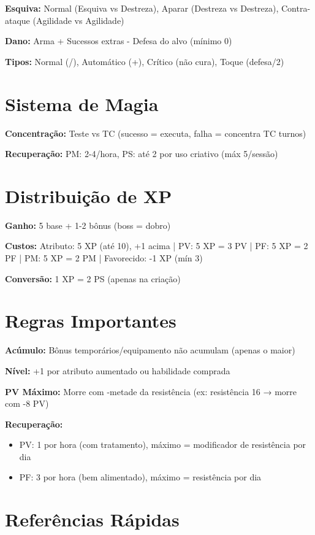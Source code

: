 \textbf{Esquiva:} Normal (Esquiva vs Destreza), Aparar (Destreza vs Destreza), Contra-ataque (Agilidade vs Agilidade)

\textbf{Dano:} Arma + Sucessos extras - Defesa do alvo (mínimo 0)

\textbf{Tipos:} Normal (/), Automático (+), Crítico (não cura), Toque (defesa/2)

\section{Sistema de Magia}

\textbf{Concentração:} Teste vs TC (sucesso = executa, falha = concentra TC turnos)


\textbf{Recuperação:} PM: 2-4/hora, PS: até 2 por uso criativo (máx 5/sessão)

\section{Distribuição de XP}

\textbf{Ganho:} 5 base + 1-2 bônus (boss = dobro)

\textbf{Custos:} Atributo: 5 XP (até 10), +1 acima | PV: 5 XP = 3 PV | PF: 5 XP = 2 PF | PM: 5 XP = 2 PM | Favorecido: -1 XP (mín 3)

\textbf{Conversão:} 1 XP = 2 PS (apenas na criação)

\section{Regras Importantes}

\textbf{Acúmulo:} Bônus temporários/equipamento não acumulam (apenas o maior)

\textbf{Nível:} +1 por atributo aumentado ou habilidade comprada

\textbf{PV Máximo:} Morre com -metade da resistência (ex: resistência 16 → morre com -8 PV)

\textbf{Recuperação:}
\begin{itemize}
    \item PV: 1 por hora (com tratamento), máximo = modificador de resistência por dia
    \item PF: 3 por hora (bem alimentado), máximo = resistência por dia
\end{itemize}

\section{Referências Rápidas}

